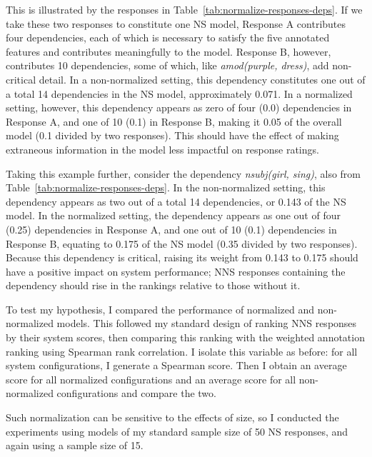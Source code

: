 This is illustrated by the responses in Table~\ref{tab:normalize-responses-deps}. If we take these two responses to constitute one NS model, Response A contributes four dependencies, each of which is necessary to satisfy the five annotated features and contributes meaningfully to the model. Response B, however, contributes 10 dependencies, some of which, like \textit{amod(purple, dress)}, add non-critical detail. In a non-normalized setting, this dependency constitutes one out of a total 14 dependencies in the NS model, approximately 0.071. In a normalized setting, however, this dependency appears as zero of four (0.0) dependencies in Response A, and one of 10 (0.1) in Response B, making it 0.05 of the overall model (0.1 divided by two responses). This should have the effect of making extraneous information in the model less impactful on response ratings.

Taking this example further, consider the dependency \textit{nsubj(girl, sing)}, also from Table~\ref{tab:normalize-responses-deps}. In the non-normalized setting, this dependency appears as two out of a total 14 dependencies, or 0.143 of the NS model. In the normalized setting, the dependency appears as one out of four (0.25) dependencies in Response A, and one out of 10 (0.1) dependencies in Response B, equating to 0.175 of the NS model (0.35 divided by two responses). Because this dependency is critical, raising its weight from 0.143 to 0.175 should have a positive impact on system performance; NNS responses containing the dependency should rise in the rankings relative to those without it. 

To test my hypothesis, I compared the performance of normalized and non-normalized models. This followed my standard design of ranking NNS responses by their system scores, then comparing this ranking with the weighted annotation ranking using Spearman rank correlation. I isolate this variable as before: for all system configurations, I generate a Spearman score. Then I obtain an average score for all normalized configurations and an average score for all non-normalized configurations and compare the two.

Such normalization can be sensitive to the effects of size, so I conducted the  experiments using models of my standard sample size of 50 NS responses, and again using a sample size of 15.


